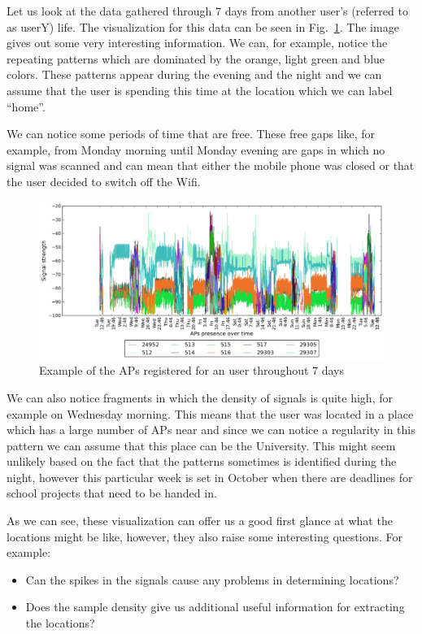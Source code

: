 Let us look at the data gathered through $7$ days from another user's (referred
to as userY) life. The visualization for this data can be seen in
Fig.~\ref{user_3_7d}. The image gives out some very interesting information. We
can, for example, notice the repeating patterns which are dominated by the
orange, light green and blue colors. These patterns appear during the evening
and the night and we can assume that the user is spending this time at the
location which we can label ``home''.

We can notice some periods of time that are free. These free gaps like, for
example, from Monday morning until Monday evening are gaps in which no signal
was scanned and can mean that either the mobile phone was closed or that the
user decided to switch off the Wifi.

\begin{figure}[ht]
\centering
\includegraphics[height =
0.45\textwidth]{figures/user_3_sorted_7days_plot.png}
\caption{Example of the APs registered for an user throughout 7 days}
\label{user_3_7d}
\end{figure}

We can also notice fragments in which the density of signals is quite high, for
example on Wednesday morning. This means that the user was located in a place
which has a large number of APs near and since we can notice a regularity in
this pattern we can assume that this place can be the University. This might
seem unlikely based on the fact that the patterns sometimes is identified during
the night, however this particular week is set in October when there are
deadlines for school projects that need to be handed in.

As we can see, these visualization can offer us a good first glance at what the
locations might be like, however, they also raise some interesting questions.
For example:
\begin{itemize}
  \item Can the spikes in the signals cause any problems in determining
  locations?
  \item Does the sample density give us additional useful information for
  extracting the locations?
\end{itemize}

